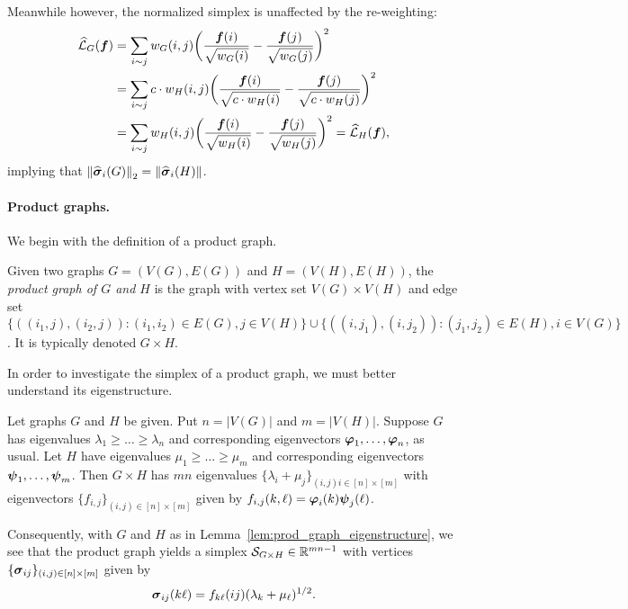 Meanwhile however, the normalized simplex is unaffected by the re-weighting: 
\begin{align*}\widehat{\mathcal{L}}_G(\vb*{f})&=\sum_{i\sim j}w_G(i,j)\bigg(\frac{\vb*{f}(i)}{\sqrt{w_G(i)}}-\frac{\vb*{f}(j)}{\sqrt{w_G(j)}}\bigg)^2\\
&= \sum_{i\sim j}c\cdot w_H(i,j)\bigg(\frac{\vb*{f}(i)}{\sqrt{c\cdot w_H(i)}}-\frac{\vb*{f}(j)}{\sqrt{c\cdot w_H(j)}}\bigg)^2 \\
&= \sum_{i\sim j} w_H(i,j)\bigg(\frac{\vb*{f}(i)}{\sqrt{ w_H(i)}}-\frac{\vb*{f}(j)}{\sqrt{ w_H(j)}}\bigg)^2 = \widehat{\mathcal{L}}_H(\vb*{f}),
\end{align*}
implying that $\norm{\widehat{\vb*{\sigma}}_i(G)}_2 = \norm{\widehat{\vb*{\sigma}}_i(H)}$. 

\paragraph{Product graphs.}
We begin with the definition of a product graph. 

\begin{definition}
	\label{def:product_graphs}
	Given two graphs $G=(V(G),E(G))$ and $H=(V(H), E(H))$, the \emph{product graph of $G$ and $H$} is the graph with vertex set $V(G)\times V(H)$ and edge set
	$\{((i_1,j),(i_2,j)):(i_1,i_2)\in E(G), j\in V(H)\}\cup\{((i,j_1),(i,j_2)):(j_1,j_2)\in E(H), i\in V(G)\}$. It is typically denoted $G\times H$. 
\end{definition} 

In order to investigate the simplex of a product graph, we must better understand its eigenstructure. 

\begin{lemma}
	\label{lem:prod_graph_eigenstructure}
	Let graphs $G$  and $H$ be given. Put $n=|V(G)|$ and $m=|V(H)|$. Suppose $G$ has eigenvalues $\lambda_1\geq \dots\geq \lambda_{n}$ and corresponding eigenvectors $\vb*{\varphi}_1,\dots,\vb*{\varphi}_{n}$, as usual. Let $H$ have eigenvalues $\mu_1\geq \dots\geq \mu_{m}$ and corresponding eigenvectors $\vb*{\psi}_1,\dots,\vb*{\psi}_{m}$. Then $G\times H$ has $mn$ eigenvalues $\{\lambda_i+\mu_j\}_{(i,j)i\in[n]\times[m]}$ with eigenvectors $\{f_{i,j}\}_{(i,j)\in[n]\times[m]}$ given by 
	$f_{i,j}(k,\ell) = \vb*{\varphi}_i(k)\vb*{\psi}_j(\ell)$. 
\end{lemma}

Consequently, with $G$ and $H$ as in Lemma~\ref{lem:prod_graph_eigenstructure}, we see that the product graph yields a simplex $\mathcal{S}_{G\times H}\in\mathbb{R}^{mn-1}$ with vertices $\{\vb*{\sigma}_{ij}\}_{(i,j)\in[n]\times[m]}$ given by 
\[\vb*{\sigma}_{ij}(k\ell)=f_{k\ell}(ij)(\lambda_k+\mu_\ell)^{1/2}.\]


